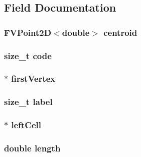 \subsection{Field Documentation}
\hypertarget{classFVEdge2D_ab3ed78ad91cf05def39147f46817c454}{
\subsubsection[{centroid}]{\setlength{\rightskip}{0pt plus 5cm}FVPoint2D$<$double$>$ {\bf centroid}}}
\label{db/d31/classFVEdge2D_ab3ed78ad91cf05def39147f46817c454}
\hypertarget{classFVEdge2D_acf258c3b3328a96e3ee1e3b875b7874f}{
\subsubsection[{code}]{\setlength{\rightskip}{0pt plus 5cm}size\_\-t {\bf code}}}
\label{db/d31/classFVEdge2D_acf258c3b3328a96e3ee1e3b875b7874f}
\hypertarget{classFVEdge2D_aa200b3a3e97b615f25128922c926e1b4}{
\subsubsection[{firstVertex}]{$\ast$ {\bf firstVertex}}}
\label{db/d31/classFVEdge2D_aa200b3a3e97b615f25128922c926e1b4}
\hypertarget{classFVEdge2D_a1ec973463c76e6d9e91160720959ad68}{
\subsubsection[{label}]{\setlength{\rightskip}{0pt plus 5cm}size\_\-t {\bf label}}}
\label{db/d31/classFVEdge2D_a1ec973463c76e6d9e91160720959ad68}
\hypertarget{classFVEdge2D_aba085f043c4b6ddc571ff574f4c4e3e3}{
\subsubsection[{leftCell}]{$\ast$ {\bf leftCell}}}
\label{db/d31/classFVEdge2D_aba085f043c4b6ddc571ff574f4c4e3e3}
\hypertarget{classFVEdge2D_a928b11f5716331f0b89abe7d8d4124b4}{
\subsubsection[{length}]{\setlength{\rightskip}{0pt plus 5cm}double {\bf length}}}
